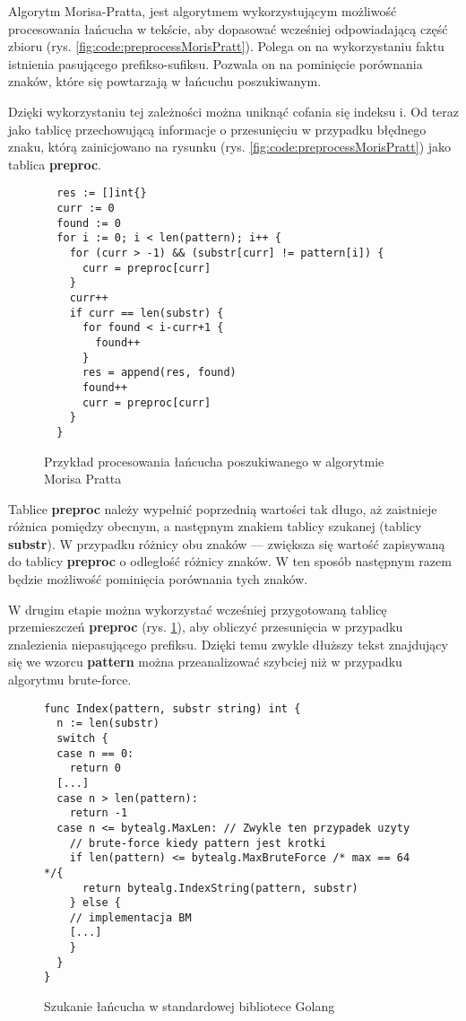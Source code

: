 Algorytm Morisa-Pratta, jest algorytmem wykorzystującym możliwość procesowania 
łańcucha w tekście, aby dopasować wcześniej odpowiadającą część zbioru
(rys. \ref{fig:code:preprocessMorisPratt}). Polega on na wykorzystaniu faktu
istnienia pasującego prefikso-sufiksu. Pozwala on na pominięcie porównania
znaków, które się powtarzają w łańcuchu poszukiwanym.

Dzięki wykorzystaniu tej zależności można uniknąć cofania się indeksu i. 
Od teraz jako tablicę przechowującą informacje o przesunięciu w przypadku 
błędnego znaku, którą zainicjowano na rysunku (rys. \ref{fig:code:preprocessMorisPratt})
jako tablica \textbf{preproc}.

\begin{figure}[htbp]
    \centering
    \begin{lstlisting}
  res := []int{}
  curr := 0
  found := 0
  for i := 0; i < len(pattern); i++ {
    for (curr > -1) && (substr[curr] != pattern[i]) {
      curr = preproc[curr]
    }
    curr++
    if curr == len(substr) {
      for found < i-curr+1 {
        found++
      }
      res = append(res, found)
      found++
      curr = preproc[curr]
    }
  }
    \end{lstlisting}
    \caption{Przykład procesowania łańcucha poszukiwanego w algorytmie Morisa Pratta}
    \label{fig:code:algoMorisPratt}
  \end{figure}

Tablice \textbf{preproc} należy wypełnić poprzednią wartości tak długo, aż zaistnieje
różnica pomiędzy obecnym, a następnym znakiem tablicy szukanej (tablicy 
\textbf{substr}). W przypadku różnicy obu znaków — zwiększa się wartość zapisywaną 
do tablicy \textbf{preproc} o odległość różnicy znaków. W ten sposób następnym
 razem będzie możliwość pominięcia porównania tych znaków.

W drugim etapie można wykorzystać wcześniej przygotowaną tablicę przemieszczeń 
\textbf{preproc} (rys. \ref{fig:code:algoMorisPratt}), aby obliczyć przesunięcia w przypadku znalezienia 
niepasującego prefiksu. Dzięki temu zwykle 
dłuższy tekst znajdujący się we wzorcu \textbf{pattern} można przeanalizować szybciej
niż w przypadku algorytmu brute-force.

\begin{figure}[htbp]
    \centering
\begin{lstlisting}
func Index(pattern, substr string) int {
  n := len(substr)
  switch {
  case n == 0:
    return 0
  [...]
  case n > len(pattern):
    return -1
  case n <= bytealg.MaxLen: // Zwykle ten przypadek uzyty
    // brute-force kiedy pattern jest krotki
    if len(pattern) <= bytealg.MaxBruteForce /* max == 64 */{
      return bytealg.IndexString(pattern, substr)
    } else { 
    // implementacja BM
    [...]
    }
  }
}
\end{lstlisting}
\caption{Szukanie łańcucha w standardowej bibliotece Golang}
\label{fig:code:golangSearchInsideString}
\end{figure}

